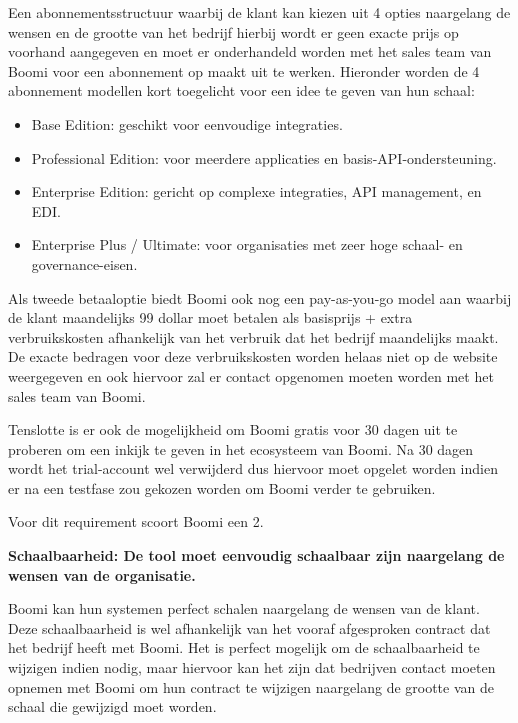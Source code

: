 \vspace{\baselineskip}

Een abonnementsstructuur waarbij de klant kan kiezen uit 4 opties naargelang de wensen en de grootte van het bedrijf hierbij wordt er geen exacte prijs op voorhand aangegeven en moet er onderhandeld worden met het sales team van Boomi voor een abonnement op maakt uit te werken. Hieronder worden de 4 abonnement modellen kort toegelicht voor een idee te geven van hun schaal:

\begin{itemize}
    \item Base Edition: geschikt voor eenvoudige integraties.
    \item Professional Edition: voor meerdere applicaties en basis-API-ondersteuning.
    \item Enterprise Edition:  gericht op complexe integraties, API management, en EDI.
    \item Enterprise Plus / Ultimate:  voor organisaties met zeer hoge schaal- en governance-eisen.
\end{itemize}

Als tweede betaaloptie biedt Boomi ook nog een pay-as-you-go model aan waarbij de klant maandelijks 99 dollar moet betalen als basisprijs + extra verbruikskosten afhankelijk van het verbruik dat het bedrijf maandelijks maakt. De exacte bedragen voor deze verbruikskosten worden helaas niet op de website weergegeven en ook hiervoor zal er contact opgenomen moeten worden met het sales team van Boomi.

Tenslotte is er ook de mogelijkheid om Boomi gratis voor 30 dagen uit te proberen om een inkijk te geven in het ecosysteem van Boomi. Na 30 dagen wordt het trial-account wel verwijderd dus hiervoor moet opgelet worden indien er na een testfase zou gekozen worden om Boomi verder te gebruiken.

Voor dit requirement scoort Boomi een 2.

\vspace{\baselineskip}

\textbf{Schaalbaarheid: De tool moet eenvoudig schaalbaar zijn naargelang de wensen van de organisatie.}

\vspace{\baselineskip}

Boomi kan hun systemen perfect schalen naargelang de wensen van de klant. Deze schaalbaarheid is wel afhankelijk van het vooraf afgesproken contract dat het bedrijf heeft met Boomi. Het is perfect mogelijk om de schaalbaarheid te wijzigen indien nodig, maar hiervoor kan het zijn dat bedrijven contact moeten opnemen met Boomi om hun contract te wijzigen naargelang de grootte van de schaal die gewijzigd moet worden.

